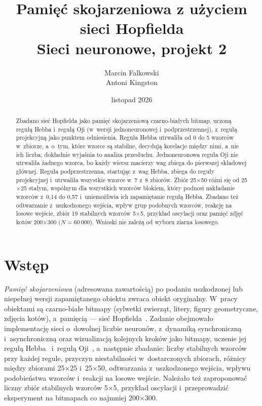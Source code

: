 \documentclass[11pt,a4paper]{article}
\title{Pamięć skojarzeniowa z użyciem sieci Hopfielda\\
\large Sieci neuronowe, projekt 2}
\author{Marcin Falkowski \\ Antoni Kingston}
\date{listopad 2026}
\begin{document}
\maketitle

\begin{abstract}
Zbadano sieć Hopfielda jako pamięć skojarzeniową czarno-białych bitmap, uczoną regułą Hebba
i~regułą Oji (w~wersji jednoneuronowej i~podprzestrzennej), z~regułą projekcyjną jako punktem
odniesienia. Reguła Hebba utrwaliła od 0 do 5 wzorców w~zbiorze, a~o~tym, które wzorce są
stabilne, decydują korelacje między nimi, a~nie ich liczba; dokładnie wyjaśnia to analiza
przesłuchu. Jednoneuronowa reguła Oji nie utrwaliła żadnego wzorca, bo każdy wiersz macierzy wag
zbiega do pierwszej składowej głównej. Reguła podprzestrzenna, startując z~wag Hebba, zbiega do
reguły projekcyjnej i~utrwaliła wszystkie wzorce w~7 z~8 zbiorów. Zbiór 25$\times$50 różni się
od 25$\times$25 stałym, wspólnym dla wszystkich wzorców blokiem, który podnosi nakładanie wzorców
z~0{,}14 do 0{,}57 i~uniemożliwia ich zapamiętanie regułą Hebba. Zbadano też odtwarzanie
z~uszkodzonego wejścia, wpływ grup podobnych wzorców, reakcję na losowe wejście, zbiór 19
stabilnych wzorców 5$\times$5, przykład oscylacji oraz pamięć zdjęć kotów 200$\times$300
($N=60\,000$). Wnioski nie zależą od wyboru ziarna losowego.
\end{abstract}

\section{Wstęp}

\emph{Pamięć skojarzeniowa} (adresowana zawartością) po podaniu uszkodzonej lub niepełnej
wersji zapamiętanego obiektu zwraca obiekt oryginalny. W~pracy obiektami są czarno-białe
bitmapy (sylwetki zwierząt, litery, figury geometryczne, zdjęcia kotów), a~pamięcią --- sieć
Hopfielda~\cite{hopfield1982}. Zadanie obejmowało implementację sieci o~dowolnej liczbie
neuronów, z~dynamiką synchroniczną i~asynchroniczną oraz wizualizacją kolejnych kroków jako
bitmapy, uczenie jej regułą Hebba~\cite{hebb1949} i~regułą Oji~\cite{oja1982}, a~następnie
zbadanie: liczby stabilnych wzorców przy każdej regule, przyczyn niestabilności w~dostarczonych
zbiorach, różnicy między zbiorami 25$\times$25 i~25$\times$50, odtwarzania z~uszkodzonego
wejścia, wpływu podobieństwa wzorców i~reakcji na losowe wejście. Należało też zaproponować
liczny zbiór stabilnych wzorców 5$\times$5, przykład oscylacji i~przeprowadzić eksperyment na
bitmapach co najmniej 200$\times$300.
\end{document}
